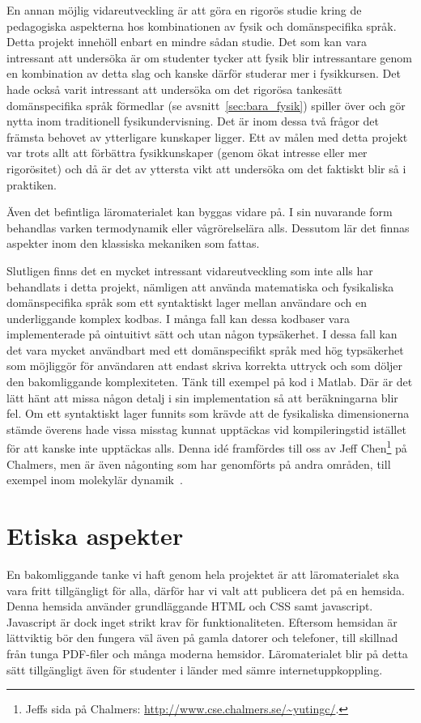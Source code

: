 En annan möjlig vidareutveckling är att göra en rigorös studie kring de
pedagogiska aspekterna hos kombinationen av fysik och domänspecifika språk.
Detta projekt innehöll enbart en mindre sådan studie. Det som kan vara
intressant att undersöka är om studenter tycker att fysik blir intressantare
genom en kombination av detta slag och kanske därför studerar mer i fysikkursen.
Det hade också varit intressant att undersöka om det rigorösa tankesätt
domänspecifika språk förmedlar (se avsnitt~\ref{sec:bara_fysik}) spiller över och
gör nytta inom traditionell fysikundervisning. Det är inom dessa två frågor det
främsta behovet av ytterligare kunskaper ligger. Ett av målen med detta projekt var trots allt att förbättra fysikkunskaper (genom ökat intresse eller mer
rigorösitet) och då är det av yttersta vikt att undersöka om det faktiskt blir
så i praktiken.

Även det befintliga läromaterialet kan byggas vidare på. I sin nuvarande
form behandlas varken termodynamik eller vågrörelselära alls. Dessutom lär
det finnas aspekter inom den klassiska mekaniken som fattas.

Slutligen finns det en mycket intressant vidareutveckling som inte alls har
behandlats i detta projekt, nämligen att använda matematiska och fysikaliska domänspecifika språk som
ett syntaktiskt lager mellan användare och en underliggande komplex kodbas. I
många fall kan dessa kodbaser vara implementerade på ointuitivt sätt och utan
någon typsäkerhet. I dessa fall kan det vara mycket användbart med ett
domänspecifikt språk med hög typsäkerhet som möjliggör för användaren att
endast skriva korrekta uttryck och som döljer den bakomliggande komplexiteten. Tänk till exempel på kod i Matlab. Där är det lätt hänt att missa någon detalj i sin implementation så att beräkningarna blir fel. Om ett syntaktiskt lager funnits som krävde att de fysikaliska dimensionerna stämde överens hade vissa misstag kunnat upptäckas vid kompileringstid istället för att kanske inte upptäckas alls. Denna idé framfördes till oss av Jeff Chen\footnote{Jeffs sida på Chalmers:
\url{http://www.cse.chalmers.se/\~yutingc/}.}
på Chalmers, men är även någonting som har genomförts på andra områden, till
exempel inom molekylär dynamik~\cite{MD}.

\section{Etiska aspekter}

En bakomliggande tanke vi haft genom hela projektet är att läromaterialet ska
vara fritt tillgängligt för alla, därför har vi valt att publicera det på en
hemsida.  Denna hemsida använder grundläggande HTML och CSS samt javascript.
Javascript är dock inget strikt krav för funktionaliteten. Eftersom hemsidan är
lättviktig bör den fungera väl även på gamla datorer och telefoner, till
skillnad från tunga PDF-filer och många moderna hemsidor. Läromaterialet blir på
detta sätt tillgängligt även för studenter i länder med sämre
internetuppkoppling.

